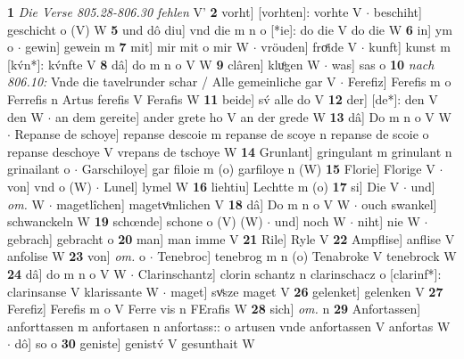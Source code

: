 \documentclass[8pt,a4paper,notitlepage]{article}
\begin{document}
\begin{table}[ht]
\begin{minipage}[t]{0.5\linewidth}
\textbf{1} \textit{Die Verse 805.28-806.30 fehlen} V'  \textbf{2} vorht] [vorhten]: vorhte V  $\cdot$ beschiht] geschicht o (V) W \textbf{5} und dô diu] vnd die m n o [*ie]: do die V do die W \textbf{6} in] ym o  $\cdot$ gewin] gewein m \textbf{7} mit] mir mit o mir W  $\cdot$ vröuden] froͤide V  $\cdot$ kunft] kunst m [kv́n*]: kv́nfte V \textbf{8} dâ] do m n o V W \textbf{9} clâren] kluͦgen W  $\cdot$ was] sas o \textbf{10} \textit{nach 806.10:} Vnde die tavelrunder schar / Alle gemeinliche gar V   $\cdot$ Ferefiz] Ferefis m o Ferrefis n Artus ferefis V Ferafis W \textbf{11} beide] sv́ alle do V \textbf{12} der] [de*]: den V den W  $\cdot$ an dem gereite] ander grete ho V an der grede W \textbf{13} dâ] Do m n o V W  $\cdot$ Repanse de schoye] repanse descoie m repanse de scoye n repanse de scoie o repanse deschoye V vrepans de tschoye W \textbf{14} Grunlant] gringulant m grinulant n grinailant o  $\cdot$ Garschiloye] gar filoie m (o) garfiloye n (W) \textbf{15} Florie] Florige V  $\cdot$ von] vnd o (W)  $\cdot$ Lunel] lymel W \textbf{16} liehtiu] Lechtte m (o) \textbf{17} si] Die V  $\cdot$ und] \textit{om.} W  $\cdot$ magetlîchen] magetvͦmlichen V \textbf{18} dâ] Do m n o V W  $\cdot$ ouch swankel] schwanckeln W \textbf{19} schœnde] schone o (V) (W)  $\cdot$ und] noch W  $\cdot$ niht] nie W  $\cdot$ gebrach] gebracht o \textbf{20} man] man imme V \textbf{21} Rile] Ryle V \textbf{22} Ampflise] anflise V anfolise W \textbf{23} von] \textit{om.} o  $\cdot$ Tenebroc] tenebrog m n (o) Tenabroke V tenebrock W \textbf{24} dâ] do m n o V W  $\cdot$ Clarinschantz] clorin schantz n clarinschacz o [clarinf*]: clarinsanse V klarissante W  $\cdot$ maget] svͤsze maget V \textbf{26} gelenket] gelenken V \textbf{27} Ferefiz] Ferefis m o V Ferre vis n FErafis W \textbf{28} sich] \textit{om.} n \textbf{29} Anfortassen] anforttassen m anfortasen n anfortass:: o artusen vnde anfortassen V anfortas W  $\cdot$ dô] so o \textbf{30} geniste] genistv́ V gesunthait W \newline
\end{minipage}
\end{table}
\newpage
\end{document}
